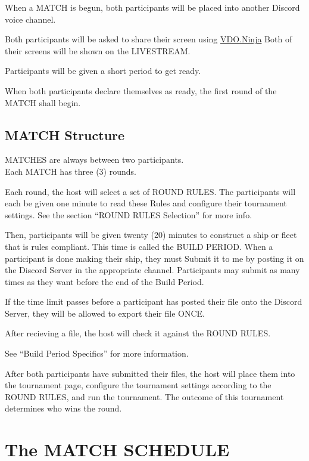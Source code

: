 \documentclass[11pt]{article}
\newcommand{\termemph}[1]{\uppercase{#1}}
\begin{document}
When a \termemph{match} is begun, both participants will be placed into another Discord voice channel.

Both participants will be asked to share their screen using \href{https://vdo.ninja/}{VDO.Ninja}
Both of their screens will be shown on the \termemph{Livestream}.

Participants will be given a short period to get ready. 

When both participants declare themselves as ready, the first round of the \termemph{match} shall begin.

\subsection{\termemph{match} Structure}
\termemph{matches} are always between two participants.\\
Each \termemph{match} has three (3) rounds.

Each round, the host will select a set of \termemph{Round Rules}. The participants will each be given 
one minute to read these Rules and configure their tournament settings. See the section 
``\termemph{Round Rules} Selection'' for more info.

Then, participants will be given twenty (20) minutes to construct a ship or fleet that is rules
compliant.
This time is called the \termemph{Build Period}.
When a participant is done making their ship, they must Submit it to me by posting it on the 
Discord Server in the appropriate channel. Participants may submit as many times as they want
before the end of the Build Period.

If the time limit passes before a participant has posted their file onto the Discord Server, they 
will be allowed to export their file ONCE.

After recieving a file, the host will check it against the \termemph{Round Rules}.

See ``Build Period Specifics'' for more information.

After both participants have submitted their files, the host will place them into the tournament 
page, configure the tournament settings according to the \termemph{Round Rules}, and run the tournament. The 
outcome of this tournament determines who wins the round.

\section{The \termemph{Match Schedule}}
\end{document}
